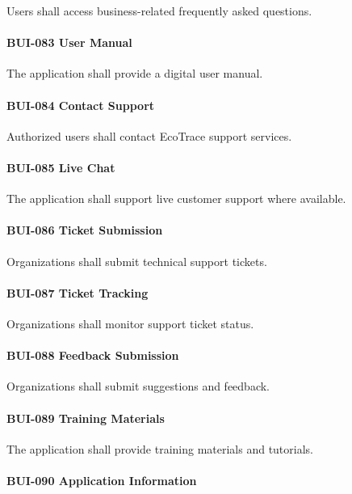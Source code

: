 Users shall access business-related frequently asked questions.

\paragraph{BUI-083 User Manual}

The application shall provide a digital user manual.

\paragraph{BUI-084 Contact Support}

Authorized users shall contact EcoTrace support services.

\paragraph{BUI-085 Live Chat}

The application shall support live customer support where available.

\paragraph{BUI-086 Ticket Submission}

Organizations shall submit technical support tickets.

\paragraph{BUI-087 Ticket Tracking}

Organizations shall monitor support ticket status.

\paragraph{BUI-088 Feedback Submission}

Organizations shall submit suggestions and feedback.

\paragraph{BUI-089 Training Materials}

The application shall provide training materials and tutorials.

\paragraph{BUI-090 Application Information}

